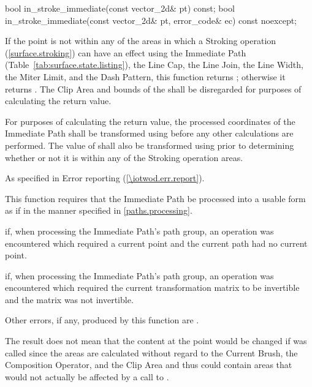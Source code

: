 \begin{itemdecl}
bool in_stroke_immediate(const vector_2d& pt) const;
bool in_stroke_immediate(const vector_2d& pt, error_code& ec) const noexcept;
\end{itemdecl}
\begin{itemdescr}
\pnum
\returns
If the point  is not within any of the areas in which a Stroking operation (\ref{surface.stroking}) can have an effect using the Immediate Path (Table~\ref{tab:surface.state.listing}), the Line Cap, the Line Join, the Line Width, the Miter Limit, and the Dash Pattern, this function returns ; otherwise it returns . The Clip Area and bounds of the \underlyingsurface shall be disregarded for purposes of calculating the return value.

\pnum
For purposes of calculating the return value, the processed coordinates of the Immediate Path shall be transformed using  before any other calculations are performed. The value of  shall also be transformed using  prior to determining whether or not it is within any of the Stroking operation areas.

\pnum
\throws
As specified in Error reporting (\ref{\iotwod.err.report}).

\pnum
\remarks
This function requires that the Immediate Path be processed into a usable form as if in the manner specified in \ref{paths.processing}.

\pnum
\errors
{} if, when processing the Immediate Path's path group, an operation was encountered which required a current point and the current path had no current point.

\pnum
{} if, when processing the Immediate Path's path group, an operation was encountered which required the current transformation matrix to be invertible and the matrix was not invertible.

\pnum
Other errors, if any, produced by this function are .

\pnum
\realnotes
The result does not mean that the content at the point  would be changed if  was called since the areas are calculated without regard to the Current Brush, the Composition Operator, and the Clip Area and thus could contain areas that would not actually be affected by a call to .
\end{itemdescr}

